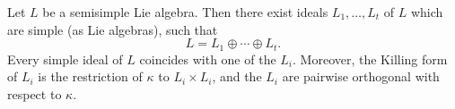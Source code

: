 Let $L$ be a semisimple Lie algebra. Then there exist ideals $L_1, \ldots, L_t$ of $L$ which are simple (as Lie algebras), such that
$$L = L_1 \oplus \cdots \oplus L_t.$$
Every simple ideal of $L$ coincides with one of the $L_i$. Moreover, the Killing form of $L_i$ is the restriction of $\kappa$ to $L_i \times L_i$, and the $L_i$ are pairwise orthogonal with respect to $\kappa$.
